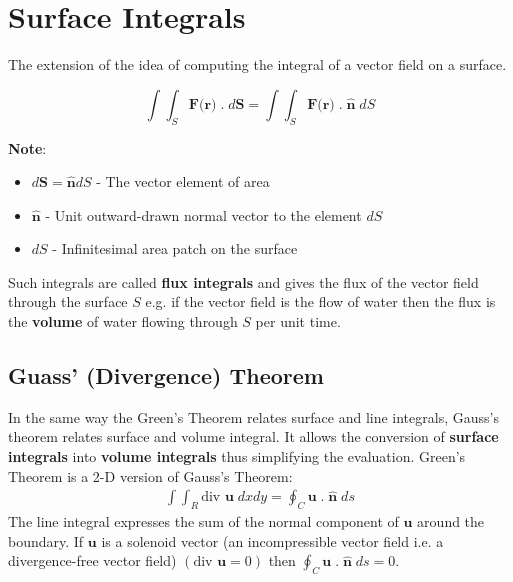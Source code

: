 \documentclass[10pt,a4paper]{article}
\begin{document}
\section{Surface Integrals}

The extension of the idea of computing the integral of a vector field on a surface.

\begin{tcolorbox}[breakable,colback=white]
    $$
        \int \int_S \textbf{F(r)}\;.\;d\textbf{S} = \int \int_S \textbf{F(r)}\;.\;\hat{\textbf{n}}\; dS  
    $$
\end{tcolorbox}

\begin{tcolorbox}[breakable,colback=white]
\textbf{Note}:
\begin{itemize}
    \item $d \textbf{S}=\hat{\textbf{n}}dS$ - The vector element of area
    \item $\hat{\textbf{n}}$ - Unit outward-drawn normal vector to the element $dS$
    \item $dS$ - Infinitesimal area patch on the surface
\end{itemize}
\end{tcolorbox}

Such integrals are called \textbf{flux integrals} and gives the flux of the vector field through the
surface $S$ e.g. if the vector field is the flow of water then the flux is the \textbf{volume} of
water flowing through $S$ per unit time.

\subsection{Guass' (Divergence) Theorem}

In the same way the Green's Theorem relates surface and line integrals, Gauss's theorem relates
surface and volume integral. It allows the conversion of \textbf{surface integrals} into
\textbf{volume integrals} thus simplifying the evaluation. Green's Theorem is a 2-D version of Gauss's Theorem:
\begin{align*}
    \int \int_R \text{div }\textbf{u}\; dxdy = \oint_C \textbf{u}\; . \; \hat{\textbf{n}}\; ds
\end{align*}
The line integral expresses the sum of the normal component of $\textbf{u}$ around the boundary. If
$\textbf{u}$ is a solenoid vector (an incompressible vector field i.e. a divergence-free vector field) $(\text{div }\textbf{u}=0)$ then $\oint_C \textbf{u}\; . \;
\hat{\textbf{n}}\; ds = 0$.
\end{document}
